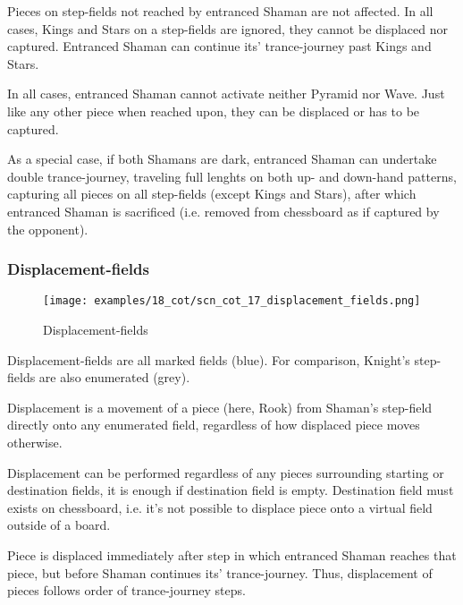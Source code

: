 Pieces on step-fields not reached by entranced Shaman are not affected. In all
cases, Kings and Stars on a step-fields are ignored, they cannot be displaced
nor captured. Entranced Shaman can continue its' trance-journey past Kings and Stars.

In all cases, entranced Shaman cannot activate neither Pyramid nor Wave. Just like
any other piece when reached upon, they can be displaced or has to be captured.

As a special case, if both Shamans are dark, entranced Shaman can undertake double
trance-journey, traveling full lenghts on both up- and down-hand patterns, capturing
all pieces on all step-fields (except Kings and Stars), after which entranced Shaman
is sacrificed (i.e. removed from chessboard as if captured by the opponent).

\clearpage %

\subsubsection*{Displacement-fields}

\noindent
\begin{figure}[!h]
\texttt{[image: examples/18\_cot/scn\_cot\_17\_displacement\_fields.png]}
\caption{Displacement-fields}
\label{fig:scn_cot_17_displacement_fields}
\end{figure}

Displacement-fields are all marked fields (blue). For comparison, Knight's
step-fields are also enumerated (grey).

Displacement is a movement of a piece (here, Rook) from Shaman's step-field directly
onto any enumerated field, regardless of how displaced piece moves otherwise.

Displacement can be performed regardless of any pieces surrounding starting or
destination fields, it is enough if destination field is empty. Destination field
must exists on chessboard, i.e. it's not possible to displace piece onto a virtual
field outside of a board.

Piece is displaced immediately after step in which entranced Shaman reaches that piece,
but before Shaman continues its' trance-journey. Thus, displacement of pieces follows
order of trance-journey steps.


